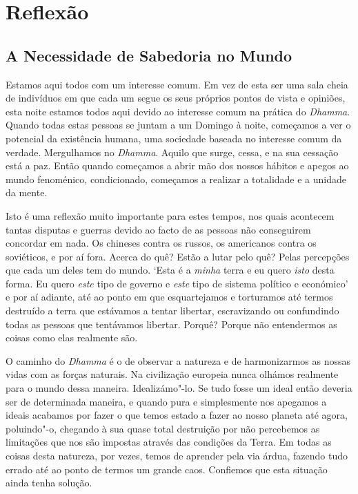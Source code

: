 \part{Reflexão}

\chapter{A Necessidade de Sabedoria no Mundo}

Estamos aqui todos com um interesse comum. Em vez de esta ser uma sala
cheia de indivíduos em que cada um segue os seus próprios pontos de
vista e opiniões, esta noite estamos todos aqui devido ao interesse
comum na prática do \emph{Dhamma}. Quando todas estas pessoas se
juntam a um Domingo à noite, começamos a ver o potencial da existência
humana, uma sociedade baseada no interesse comum da verdade. Mergulhamos
no \emph{Dhamma}. Aquilo que surge, cessa, e na sua cessação está a paz.
Então quando começamos a abrir mão dos nossos hábitos e apegos ao mundo
fenoménico, condicionado, começamos a realizar a totalidade e a unidade
da mente.

Isto é uma reflexão muito importante para estes tempos, nos quais
acontecem tantas disputas e guerras devido ao facto de as pessoas não
conseguirem concordar em nada. Os chineses contra os russos, os
americanos contra os soviéticos, e por aí fora. Acerca do quê? Estão a
lutar pelo quê? Pelas percepções que cada um deles tem do mundo. `Esta é
a \emph{minha} terra e eu quero \emph{isto} desta forma. Eu quero
\emph{este} tipo de governo e \emph{este} tipo de sistema político e
económico' e por aí adiante, até ao ponto em que esquartejamos e
torturamos até termos destruído a terra que estávamos a tentar libertar,
escravizando ou confundindo todas as pessoas que tentávamos libertar.
Porquê? Porque não entendermos as coisas como elas realmente são.

O caminho do \emph{Dhamma} é o de observar a natureza e de harmonizarmos
as nossas vidas com as forças naturais. Na civilização europeia nunca
olhámos realmente para o mundo dessa maneira. Idealizámo"-lo. Se tudo
fosse um ideal então deveria ser de determinada maneira, e quando pura e
simplesmente nos apegamos a ideais acabamos por fazer o que temos
estado a fazer ao nosso planeta até agora, poluindo"-o, chegando à sua
quase total destruição por não percebemos as limitações que nos são
impostas através das condições da Terra. Em todas as coisas desta
natureza, por vezes, temos de aprender pela via árdua, fazendo tudo
errado até ao ponto de termos um grande caos. Confiemos que esta
situação ainda tenha solução.

